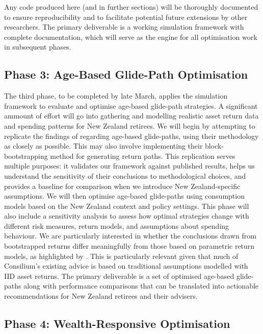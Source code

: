 \documentclass[11pt]{article}
\begin{document}
Any code produced here (and in further sections) will be thoroughly documented to ensure reproducibility and to facilitate potential future extensions by other researchers. The primary deliverable is a working simulation framework with complete documentation, which will serve as the engine for all optimisation work in subsequent phases.


\subsection{Phase 3: Age-Based Glide-Path Optimisation}

The third phase, to be completed by late March, applies the simulation framework to evaluate and optimise age-based glide-path strategies. A significant ammount of effort will go into gathering and modelling realistic asset return data and spending patterns for New Zealand retirees. We will begin by attempting to replicate the findings of \textcite{anarkulova2025beyond} regarding age-based glide-paths, using their methodology as closely as possible. This may also involve implementing their block-bootstrapping method for generating return paths. This replication serves multiple purposes: it validates our framework against published results, helps us understand the sensitivity of their conclusions to methodological choices, and provides a baseline for comparison when we introduce New Zealand-specific assumptions. We will then optimise age-based glide-paths using consumption models based on the New Zealand context and policy settings. This phase will also include a sensitivity analysis to assess how optimal strategies change with different risk measures, return models, and assumptions about spending behaviour. We are particularly interested in whether the conclusions drawn from bootstrapped returns differ meaningfully from those based on parametric return models, as highlighted by \textcite{anarkulova2025beyond}. This is particularly relevant given that much of Consilium's existing advice is based on traditional assumptions modelled with IID asset returns. The primary deliverable is a set of optimised age-based glide-paths along with performance comparisons that can be translated into actionable recommendations for New Zealand retirees and their advisers.


\subsection{Phase 4: Wealth-Responsive Optimisation}
\end{document}
